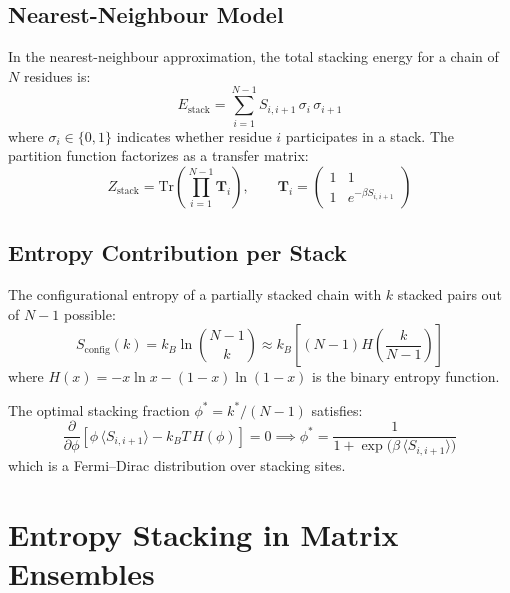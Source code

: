 \documentclass[11pt]{article}
\begin{document}
\subsection{Nearest-Neighbour Model}

In the nearest-neighbour approximation, the total stacking energy for a
chain of $N$ residues is:
\begin{equation}
  E_{\text{stack}} = \sum_{i=1}^{N-1} S_{i,i+1}\, \sigma_i\, \sigma_{i+1}
\end{equation}
where $\sigma_i \in \{0, 1\}$ indicates whether residue $i$ participates
in a stack.  The partition function factorizes as a transfer matrix:
\begin{equation}
  Z_{\text{stack}} = \text{Tr}\!\left(\prod_{i=1}^{N-1} \mathbf{T}_i\right),
  \qquad
  \mathbf{T}_i = \begin{pmatrix}
    1 & 1 \\
    1 & e^{-\beta S_{i,i+1}}
  \end{pmatrix}
\end{equation}

\subsection{Entropy Contribution per Stack}

The configurational entropy of a partially stacked chain with $k$
stacked pairs out of $N-1$ possible:
\begin{equation}
  S_{\text{config}}(k) = k_B \ln \binom{N-1}{k}
  \approx k_B \left[ (N-1) H\!\left(\frac{k}{N-1}\right) \right]
\end{equation}
where $H(x) = -x \ln x - (1-x) \ln(1-x)$ is the binary entropy
function.

The optimal stacking fraction $\phi^{*} = k^{*}/(N-1)$ satisfies:
\begin{equation}
  \frac{\partial}{\partial \phi}
  \left[ \phi\, \langle S_{i,i+1} \rangle
       - k_B T\, H(\phi) \right] = 0
  \implies
  \phi^{*} = \frac{1}{1 + \exp\!\bigl(\beta\, \langle S_{i,i+1} \rangle\bigr)}
\end{equation}
which is a Fermi--Dirac distribution over stacking sites.

\section{Entropy Stacking in Matrix Ensembles}
\end{document}
